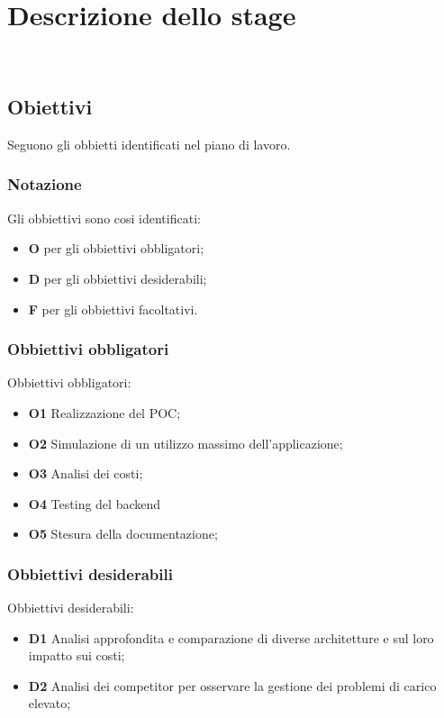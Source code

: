 \chapter{Descrizione dello stage}
\\
\label{cap:descrizione-stage}
\section{Obiettivi}
\label{sec:obiettivi}
Seguono gli obbietti identificati nel piano di lavoro.

\subsection{Notazione}
\label{subsec:notazione}
Gli obbiettivi sono cosi identificati:

\begin{itemize}
    \item \textbf{O} per gli obbiettivi obbligatori;
    \item \textbf{D} per gli obbiettivi desiderabili;
    \item \textbf{F} per gli obbiettivi facoltativi.
\end{itemize}

\subsection{Obbiettivi obbligatori}
Obbiettivi obbligatori:

\begin{itemize}
    \item \textbf{O1} Realizzazione del POC;
    \item \textbf{O2} Simulazione di un utilizzo massimo dell'applicazione;
    \item \textbf{O3} Analisi dei costi;
    \item \textbf{O4} Testing del backend
    \item \textbf{O5} Stesura della documentazione;

\end{itemize}
\subsection{Obbiettivi desiderabili}
Obbiettivi desiderabili:
\begin{itemize}
    \item \textbf{D1} Analisi approfondita e comparazione di diverse architetture e sul loro impatto sui costi;
    \item \textbf{D2} Analisi dei competitor per osservare la gestione dei problemi di carico elevato;

\end{itemize}
